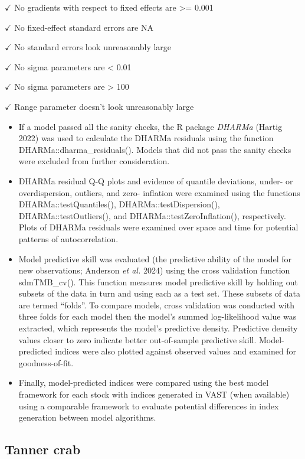 \documentclass[
]{article}
\begin{document}
\(\checkmark\) No gradients with respect to fixed effects are \textgreater= 0.001

\(\checkmark\) No fixed-effect standard errors are NA

\(\checkmark\) No standard errors look unreasonably large

\(\checkmark\) No sigma parameters are \textless{} 0.01

\(\checkmark\) No sigma parameters are \textgreater{} 100

\(\checkmark\) Range parameter doesn't look unreasonably large

\begin{itemize}
\item
  If a model passed all the sanity checks, the R package \emph{DHARMa} (Hartig 2022) was used to calculate the DHARMa residuals using the function DHARMa::dharma\_residuals(). Models that did not pass the sanity checks were excluded from further consideration.
\item
  DHARMa residual Q-Q plots and evidence of quantile deviations, under- or overdispersion, outliers, and zero- inflation were examined using the functions DHARMa::testQuantiles(), DHARMa::testDispersion(), DHARMa::testOutliers(), and DHARMa::testZeroInflation(), respectively. Plots of DHARMa residuals were examined over space and time for potential patterns of autocorrelation.
\item
  Model predictive skill was evaluated (the predictive ability of the model for new observations; Anderson \emph{et al.} 2024) using the cross validation function sdmTMB\_cv(). This function measures model predictive skill by holding out subsets of the data in turn and using each as a test set. These subsets of data are termed ``folds''. To compare models, cross validation was conducted with three folds for each model then the model's summed log-likelihood value was extracted, which represents the model's predictive density. Predictive density values closer to zero indicate better out-of-sample predictive skill. Model-predicted indices were also plotted against observed values and examined for goodness-of-fit.
\item
  Finally, model-predicted indices were compared using the best model framework for each stock with indices generated in VAST (when available) using a comparable framework to evaluate potential differences in index generation between model algorithms.
\end{itemize}

\subsection*{Tanner crab}\label{tanner-crab}
\end{document}
